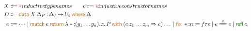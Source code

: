 \documentclass{article}
\newcommand{\meta}[1]{\mathsf{\textcolor{metacolour}{#1}}}
\newcommand{\ind}[1]{\mathsf{\textcolor{indcolour}{#1}}}
\newcommand{\constr}[1]{\mathsf{\textcolor{constrcolour}{#1}}}
\newcommand{\kw}[1]{\mathsf{\textcolor{kwcolour}{#1}}}
\newcommand{\kwopen}[1]{\kw{#1}\:}
\newcommand{\kwbin}[1]{\:\kw{#1}\:}
\newcommand{\annot}[2]{#1 \mathbin{:} #2}
\newcommand{\arr}[2]{#1 \mathbin{\rightarrow} \phantom{} #2}
\newcommand{\lam}[3]{\lambda #1 \mathbin{:} #2 \mathpunct{.} #3}
\newcommand{\app}[2]{#1 \: #2}
\newcommand{\Type}[1]{\ind{Type}_{#1}}
\newcommand{\match}[3]{\kwopen{match} #1 \kwbin{return} #2 \kwbin{with} #3}
\newcommand{\fix}[3]{\kwopen{fix} #1 \mathbin{:} #2 \mathbin{\coloneqq} \phantom{} #3}
\newcommand{\data}[3]{\kwopen{data} #1 \mathbin{:} #2 \kwbin{where} #3}
\newcommand{\refl}{\constr{refl}}
\newcommand{\equal}[3]{#1 \stackrel{#2}{=\joinrel=} #3}
\newcommand{\?}{\meta{?}}
\newcommand{\mt}{\meta{\cdot}}
\newcommand{\seq}{\,\meta{\dots}\,}
\newcommand{\any}{\meta{\texttt{\_}}}
\newcommand{\subst}[3]{#1 \mathopen{\meta{[}} #2 \mathbin{\meta{\mapsto}} #3 \mathclose{\meta{]}}}
\renewcommand{\check}[3]{#1 \vdash #2 \mathbin{\Downarrow} #3}
\renewcommand{\infer}[3]{#1 \vdash #2 \mathbin{\Uparrow} #3}
\newcommand{\red}[4]{#1 \vdash #2 \mathrel{\rhd}_{#3} #4}
\theoremstyle{definition}
\begin{document}
\begin{figure}[!h]
    {\centering
    \begin{align*}
        X &\Coloneqq \meta*{inductive type names} \qquad c \Coloneqq \meta*{inductive constructor names} \\
        D &\Coloneqq \data{\app{X}{\Delta_P}}{\arr{\Delta_I}{U_{i}}}{\Delta} \\
        e &\Coloneqq \dots \mid \match{e}{\lam*{(y_1 \seq y_n).x}{P}}{(\app{c}{z_1 \seq z_m} \Rightarrow e) \seq} \mid \fix*{n}{f}{\tau}{e} \mid \equal{e}{\tau}{e} \mid \app{\refl}{e}
    \end{align*}}
    \iffalse
    An inductive data definition $\data{\app{X}{\Delta_P}}{\arr{\Delta_I}{U_{i}}}{\Delta}$ is well-formed if the following hold:
    \begin{enumerate}
        \item $X$ does not appear in $\Delta_P, \Delta_I$;
        \item For every constructor $(\annot{c}{\tau}) \in \Delta_c$, $\tau$ has the shape $\arr{\Delta_a}{\app{X}{\any \seq}}$;
        \item For every constructor argument $(\annot{x}{\tau}) \in \Delta_a$,
        \begin{itemize}
            \item The inductive type $X$ does not appear in $\tau$; or
            \item $\tau$ has the shape $\arr{\Delta}{\app{X}{\any \seq}}$, where $X$ does not appear in $\Delta$;
        \end{itemize}
        \item $\infer{\mt}{\arr{\Delta_P}{\arr{\Delta_I}{U_i}}}{\Type{j}}$ for some universe level $j$;
        \item For every constructor $(\annot{c}{\tau}) \in \Delta_c$, $\check{\Delta_P(\annot{X}{\arr{\Delta_P}{\arr{\Delta_I}{U_i}}})}{\tau}{U_i}$.
    \end{enumerate}
    \fi
    \centering
\end{figure}
\end{document}

